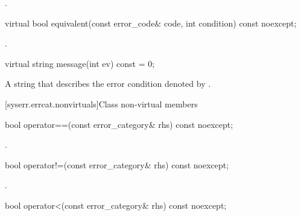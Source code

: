\begin{itemdescr}
\pnum
\returns {}.
\end{itemdescr}

\begin{itemdecl}
virtual bool equivalent(const error_code& code, int condition) const noexcept;
\end{itemdecl}

\begin{itemdescr}
\pnum
\returns {}.
\end{itemdescr}

\begin{itemdecl}
virtual string message(int ev) const = 0;
\end{itemdecl}

\begin{itemdescr}
\pnum
\returns A string that describes the error condition denoted by .
\end{itemdescr}

[syserr.errcat.nonvirtuals]{Class  non-virtual members}

\begin{itemdecl}
bool operator==(const error_category& rhs) const noexcept;
\end{itemdecl}

\begin{itemdescr}
\pnum
\returns {}.
\end{itemdescr}

\begin{itemdecl}
bool operator!=(const error_category& rhs) const noexcept;
\end{itemdecl}

\begin{itemdescr}
\pnum
\returns {}.
\end{itemdescr}

\begin{itemdecl}
bool operator<(const error_category& rhs) const noexcept;
\end{itemdecl}

